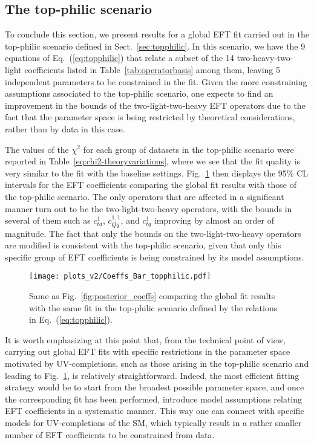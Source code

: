 \subsection{The top-philic scenario}

To conclude this section, we present results for a global EFT fit
carried out in the top-philic scenario defined in Sect.~\ref{sec:topphilic}.
%
In this scenario, we have the 9 equations of Eq.~(\ref{eq:topphilic}) that 
relate a subset of the 14
two-heavy-two-light coefficients listed in Table~\ref{tab:operatorbasis}
among them,  leaving 5 independent parameters to be constrained
in the fit.
%
Given the more constraining assumptions associated
to the top-philic scenario, one expects to find an improvement
in the bounds of the two-light-two-heavy EFT operators due to the fact
that the parameter space is being restricted by theoretical
considerations, rather than by data in this case.

The values of the $\chi^2$ for each group of datasets in the top-philic scenario
were reported in Table~\ref{eq:chi2-theoryvariations},
where we see that the fit quality is very similar to the fit with the baseline settings.
%
Fig.~\ref{fig:Coeffs_Bar_TopPhilic} then displays the 95\% CL
intervals for the EFT coefficients comparing the
global fit results with those of the top-philic scenario.
%
The only operators that are affected in a significant manner
turn out to be the two-light-two-heavy
operators, with the bounds in several of them such as
$c_{td}^1$, $c_{Qq}^{1,1}$, and $c_{tq}^1$  improving by almost an order of magnitude.
%
The fact that only the bounds on the two-light-two-heavy operators are modified
is consistent with the top-philic scenario, given that only
this specific group of EFT coefficients is being constrained by its model assumptions.

\begin{figure}[t]
  \begin{center}
     \texttt{[image: plots\_v2/Coeffs\_Bar\_topphilic.pdf]}
     \caption{\small Same as Fig.~\ref{fig:posterior_coeffs}
       comparing the global fit results with the same fit in the top-philic
       scenario defined by the relations in Eq.~(\ref{eq:topphilic}).
     \label{fig:Coeffs_Bar_TopPhilic} }
  \end{center}
\end{figure}

It is worth emphasizing at this point that,
from the technical point of view, carrying out global EFT fits with specific restrictions
in the parameter space motivated by UV-completions, such as those arising
in the top-philic scenario and leading to Fig.~\ref{fig:Coeffs_Bar_TopPhilic},
is relatively straightforward.
%
Indeed, the most efficient fitting strategy would be to start from the broadest possible
parameter space, and once the corresponding fit has been performed,
introduce model assumptions relating EFT coefficients  in a systematic manner.
%
This way one can connect with specific models for  UV-completions of the SM,
which typically result in a rather smaller number of EFT coefficients to be constrained
from data.

